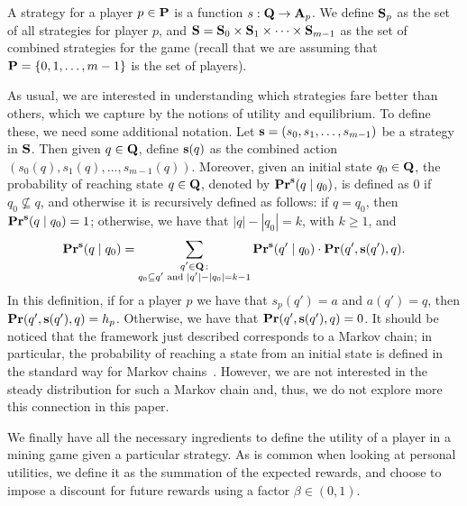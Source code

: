 A strategy for a player $p \in \mathbf{P}$ is a function $s : \mathbf{Q} \rightarrow \mathbf{A}_p$. 
We define $\mathbf{S}_p$ as the set of all strategies for player $p$, and $\mathbf{S} = \mathbf{S}_0 \times \mathbf{S}_{1} \times \cdots \times \mathbf{S}_{m-1}$ as the set of combined strategies for the game (recall that we are assuming that $\mathbf{P} = \{0, 1, \ldots, m-1\}$ is the set of players). 

As usual, we are interested in understanding which strategies fare better than others, which we capture by the notions of  utility and equilibrium. To define these, we need some additional notation. 
Let $\mathbf{s} = (s_0, s_1, \ldots, s_{m-1})$ be a strategy in $\mathbf{S}$. Then given $q \in \mathbf{Q}$, define $\mathbf{s}(q)$ as the combined action $(s_0(q), s_1(q), \ldots, s_{m-1}(q))$. Moreover, given an initial state $q_0 \in \mathbf{Q}$, 
the probability of reaching state $q \in \mathbf{Q}$, denoted by $\mathbf{Pr}^{\mathbf{s}}(q \mid q_0)$, is defined as 0 if $q_0 \not\subseteq q$, and otherwise it is recursively defined as follows: if $q =  q_0$, then $\mathbf{Pr}^{\mathbf{s}}(q \mid q_0) = 1$; otherwise, we have that $|q| - |q_0| = k$, with $k \geq 1$, and
$$
\mathbf{Pr}^{\mathbf{s}}(q \mid q_0) =
\sum_{\substack{q' \in \mathbf{Q} \,:\\ q_0 \subseteq q' \text{ and } |q'| - |q_0| = k-1}}
 \mathbf{Pr}^{\mathbf{s}}(q' \mid q_0) \cdot \mathbf{Pr}(q', \mathbf{s}(q'), q).
 $$
In this definition, if for a player $p$ we have that $s_p(q') = a$ and $a(q') = q$, then $\mathbf{Pr}(q', \mathbf{s}(q'), q) = h_p$. Otherwise, we have that $\mathbf{Pr}(q', \mathbf{s}(q'), q) = 0$. 
It should be noticed that the framework just described corresponds to a Markov chain; in particular, the probability of reaching a state from an initial state is defined in the standard way for Markov chains~\cite{MU05}. However, we are not interested in the steady distribution for such a Markov chain and, thus, we do not explore more this connection in this paper.

We finally have all the necessary ingredients to define the utility of a player in a mining game given a particular strategy. As is common 
when looking at personal utilities, we define it as the summation of the expected rewards, and choose 
to impose a discount for future rewards using a factor $\beta \in (0,1)$. 

